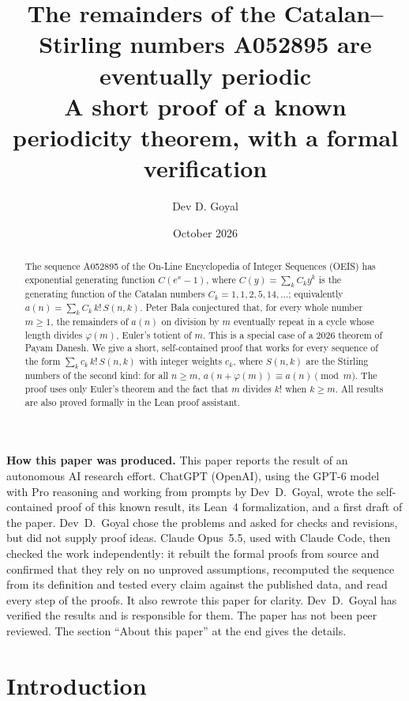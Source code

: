 \documentclass[11pt,a4paper]{article}
\title{The remainders of the Catalan--Stirling numbers A052895 are eventually periodic\\[6pt]\large A short proof of a known periodicity theorem, with a formal verification}
\author{Dev D. Goyal}
\date{October 2026}
\theoremstyle{definition}
\theoremstyle{remark}
\begin{document}
\maketitle
\begin{abstract}
The sequence A052895 of the On-Line Encyclopedia of Integer Sequences (OEIS) has exponential generating function $C(e^x-1)$, where $C(y)=\sum_kC_ky^k$ is the generating function of the Catalan numbers $C_k=1,1,2,5,14,\dots$; equivalently $a(n)=\sum_kC_k\,k!\,S(n,k)$. Peter Bala conjectured that, for every whole number $m\ge1$, the remainders of $a(n)$ on
division by $m$ eventually repeat in a cycle whose length divides $\varphi(m)$, Euler's totient of $m$. This is a special
case of a 2026 theorem of Payam Danesh. We give a short, self-contained proof that works for every sequence of the form
$\sum_k c_k\,k!\,S(n,k)$ with integer weights $c_k$, where $S(n,k)$ are the Stirling numbers of the second kind: for all
$n\ge m$, $a(n+\varphi(m))\equiv a(n)\pmod m$. The proof uses only Euler's theorem and the fact that $m$ divides $k!$
when $k\ge m$. All results are also proved formally in the Lean proof assistant.
\end{abstract}
\begin{center}\begin{minipage}{0.88\linewidth}\small
\textbf{How this paper was produced.} This paper reports the result of an autonomous AI research effort.
ChatGPT (OpenAI), using the GPT-6 model with Pro reasoning and working from prompts by Dev~D.~Goyal, wrote the self-contained proof of this known result, its Lean~4 formalization, and a first draft of the paper.
Dev~D.~Goyal chose the problems and asked for checks and revisions, but did not supply proof ideas.
Claude Opus~5.5, used with Claude Code, then checked the work independently: it rebuilt the formal proofs from
source and confirmed that they rely on no unproved assumptions, recomputed the sequence from its definition and tested
every claim against the published data, and read every step of the proofs. It also rewrote this paper for clarity.
Dev~D.~Goyal has verified the results and is responsible for them. The paper has not been peer reviewed.
The section ``About this paper'' at the end gives the details.
\end{minipage}\end{center}

\section{Introduction}
\end{document}
